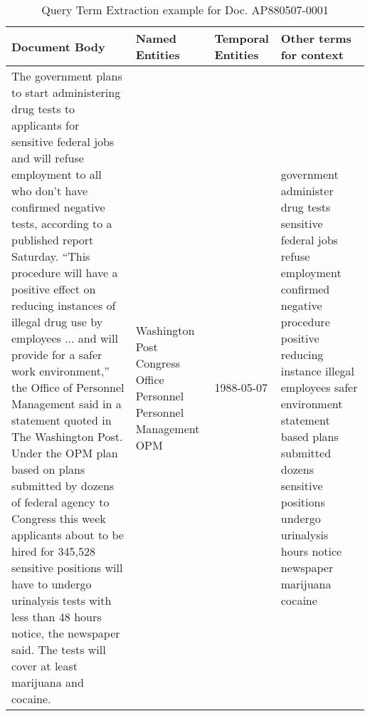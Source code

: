 \documentclass{mprop}
\begin{document}
\begin{table}[H]
\centering
\begin{tabular}{|p{6cm}|p{4cm}|p{2cm}|p{3.5cm}|}
\hline
Document Body         & Named Entities  & Temporal Entities & Other terms for \mbox{context}                \\ \hline
\small{The government plans to start administering
drug tests to applicants for sensitive federal jobs and will refuse
employment to all who don't have confirmed negative tests,
according to a published report Saturday.
   ``This procedure will have a positive effect on reducing
instances of illegal drug use by employees ... and will provide for
a safer work environment,'' the Office of Personnel Management said
in a statement quoted in The Washington Post.
   Under the OPM plan based on plans submitted by dozens of
federal agency to Congress this week applicants about to be hired
for 345,528 sensitive positions will have to undergo urinalysis
tests with less than 48 hours notice, the newspaper said. The tests
will cover at least marijuana and cocaine.}		   
& Washington Post \newline
Congress \newline
Office Personnel \newline
Personnel Management \newline
OPM  
& 1988-05-07        
& government
administer drug tests sensitive federal jobs refuse employment confirmed negative procedure positive reducing instance illegal employees safer environment statement based plans submitted dozens sensitive positions undergo urinalysis hours notice newspaper marijuana cocaine \\ \hline
\end{tabular}
\caption{Query Term Extraction example for Doc. AP880507-0001}
\label{queryterms}
\end{table}
\end{document}
